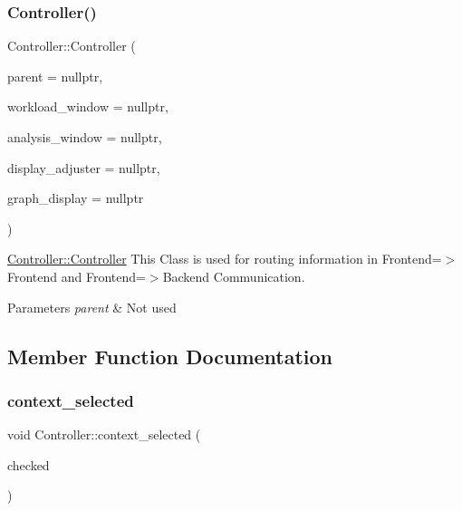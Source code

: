 \subsubsection{\texorpdfstring{Controller()}{Controller()}}
{\footnotesize\ttfamily Controller\+::\+Controller (\begin{DoxyParamCaption}\item[{Q\+Object $\ast$}]{parent = {\ttfamily nullptr},  }\item[{Workload\+Window $\ast$}]{workload\+\_\+window = {\ttfamily nullptr},  }\item[{Analysis\+Window $\ast$}]{analysis\+\_\+window = {\ttfamily nullptr},  }\item[{Display\+Adjuster $\ast$}]{display\+\_\+adjuster = {\ttfamily nullptr},  }\item[{Graph\+Display $\ast$}]{graph\+\_\+display = {\ttfamily nullptr} }\end{DoxyParamCaption})\hspace{0.3cm}{\ttfamily [explicit]}}



\hyperlink{classController_ac162dc9f74ef4ba011d7026b803c4f12}{Controller\+::\+Controller} This Class is used for routing information in Frontend=$>$Frontend and Frontend=$>$Backend Communication. 


\begin{DoxyParams}{Parameters}
{\em parent} & Not used \\
\hline
\end{DoxyParams}


\subsection{Member Function Documentation}
\mbox{\label{classController_a1573db92761b7e61b6dcace9c97aebf5}} 
\subsubsection{\texorpdfstring{context\+\_\+selected}{context\_selected}}
{\footnotesize\ttfamily void Controller\+::context\+\_\+selected (\begin{DoxyParamCaption}\item[{bool}]{checked }\end{DoxyParamCaption})\hspace{0.3cm}{\ttfamily [slot]}}



